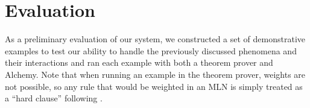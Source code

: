 \section{Evaluation}

As a preliminary evaluation of our system, we constructed a set of demonstrative
examples to test our ability to handle the previously discussed phenomena and
their interactions and ran each example with both a theorem prover and Alchemy. 
Note that when running an example in the theorem prover, weights are not
possible, so any rule that would be weighted in an MLN is simply treated as a
``hard clause'' following \citet{bos:emnlp2005}.

